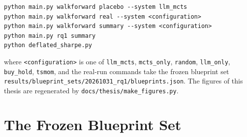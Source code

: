 \documentclass[12pt,a4paper,oneside]{book}
\theoremstyle{definition}
\newcommand{\code}[1]{\texttt{#1}}
\begin{document}
\begin{center}
\begin{minipage}{0.92\textwidth}
\small{}
\begin{verbatim}
python main.py walkforward placebo --system llm_mcts
python main.py walkforward real --system <configuration>
python main.py walkforward summary --system <configuration>
python main.py rq1 summary
python deflated_sharpe.py
\end{verbatim}
\end{minipage}
\end{center}

\noindent where \code{<configuration>} is one of \code{llm\_mcts}, \code{mcts\_only}, \code{random}, \code{llm\_only}, \code{buy\_hold}, \code{tsmom}, and the real-run commands take the frozen blueprint set \code{results/blueprint\_sets/20261031\_rq1/blueprints.json}. The figures of this thesis are regenerated by \code{docs/thesis/make\_figures.py}.

\chapter{The Frozen Blueprint Set}
\label{app:blueprints}
\end{document}
